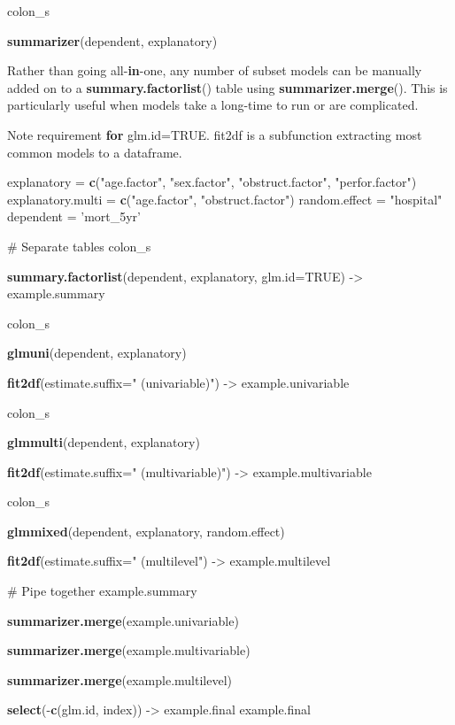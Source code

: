 \documentclass[
]{article}
\newenvironment{Shaded}{\begin{snugshade}}{\end{snugshade}}
\newcommand{\CommentTok}[1]{\textcolor[rgb]{0.54,0.53,0.53}{#1}}
\newcommand{\ControlFlowTok}[1]{\textcolor[rgb]{0.12,0.11,0.11}{\textbf{#1}}}
\newcommand{\DataTypeTok}[1]{\textcolor[rgb]{0.00,0.34,0.68}{#1}}
\newcommand{\KeywordTok}[1]{\textcolor[rgb]{0.12,0.11,0.11}{\textbf{#1}}}
\newcommand{\NormalTok}[1]{\textcolor[rgb]{0.12,0.11,0.11}{#1}}
\newcommand{\OperatorTok}[1]{\textcolor[rgb]{0.12,0.11,0.11}{#1}}
\newcommand{\OtherTok}[1]{\textcolor[rgb]{0.00,0.43,0.16}{#1}}
\newcommand{\StringTok}[1]{\textcolor[rgb]{0.75,0.01,0.01}{#1}}
\begin{document}
\begin{Shaded}
\begin{Highlighting}[]
{{{\NormalTok{colon_s }\OperatorTok{%>%}
\StringTok{    }\KeywordTok{summarizer}\NormalTok{(dependent, explanatory)}

\NormalTok{Rather than going all}\OperatorTok{-}\ControlFlowTok{in}\OperatorTok{-}\NormalTok{one, any number of subset models can be manually added on to a }\KeywordTok{summary.factorlist}\NormalTok{() table using }\KeywordTok{summarizer.merge}\NormalTok{(). This is particularly useful when models take a long}\OperatorTok{-}\NormalTok{time to run or are complicated.}

\NormalTok{Note requirement }\ControlFlowTok{for}\NormalTok{ glm.id=TRUE. fit2df is a subfunction extracting most common models to a dataframe.}

\NormalTok{explanatory =}\StringTok{ }\KeywordTok{c}\NormalTok{(}\StringTok{"age.factor"}\NormalTok{, }\StringTok{"sex.factor"}\NormalTok{, }\StringTok{"obstruct.factor"}\NormalTok{, }\StringTok{"perfor.factor"}\NormalTok{)}
\NormalTok{explanatory.multi =}\StringTok{ }\KeywordTok{c}\NormalTok{(}\StringTok{"age.factor"}\NormalTok{, }\StringTok{"obstruct.factor"}\NormalTok{)}
\NormalTok{random.effect =}\StringTok{ "hospital"}
\NormalTok{dependent =}\StringTok{ 'mort_5yr'}

\CommentTok{# Separate tables}
\NormalTok{colon_s }\OperatorTok{%>%}
\StringTok{  }\KeywordTok{summary.factorlist}\NormalTok{(dependent, explanatory, }\DataTypeTok{glm.id=}\OtherTok{TRUE}\NormalTok{) ->}\StringTok{ }\NormalTok{example.summary}

\NormalTok{colon_s }\OperatorTok{%>%}
\StringTok{  }\KeywordTok{glmuni}\NormalTok{(dependent, explanatory) }\OperatorTok{%>%}
\StringTok{  }\KeywordTok{fit2df}\NormalTok{(}\DataTypeTok{estimate.suffix=}\StringTok{" (univariable)"}\NormalTok{) ->}\StringTok{ }\NormalTok{example.univariable}

\NormalTok{colon_s }\OperatorTok{%>%}
\StringTok{  }\KeywordTok{glmmulti}\NormalTok{(dependent, explanatory) }\OperatorTok{%>%}
\StringTok{  }\KeywordTok{fit2df}\NormalTok{(}\DataTypeTok{estimate.suffix=}\StringTok{" (multivariable)"}\NormalTok{) ->}\StringTok{ }\NormalTok{example.multivariable}


\NormalTok{colon_s }\OperatorTok{%>%}
\StringTok{  }\KeywordTok{glmmixed}\NormalTok{(dependent, explanatory, random.effect) }\OperatorTok{%>%}
\StringTok{  }\KeywordTok{fit2df}\NormalTok{(}\DataTypeTok{estimate.suffix=}\StringTok{" (multilevel"}\NormalTok{) ->}\StringTok{ }\NormalTok{example.multilevel}

\CommentTok{# Pipe together}
\NormalTok{example.summary }\OperatorTok{%>%}
\StringTok{  }\KeywordTok{summarizer.merge}\NormalTok{(example.univariable) }\OperatorTok{%>%}
\StringTok{  }\KeywordTok{summarizer.merge}\NormalTok{(example.multivariable) }\OperatorTok{%>%}
\StringTok{  }\KeywordTok{summarizer.merge}\NormalTok{(example.multilevel) }\OperatorTok{%>%}
\StringTok{  }\KeywordTok{select}\NormalTok{(}\OperatorTok{-}\KeywordTok{c}\NormalTok{(glm.id, index)) ->}\StringTok{ }\NormalTok{example.final}
\NormalTok{example.final}

}}}}}}}}}}}}}}}
\end{Highlighting}
\end{Shaded}
\end{document}
